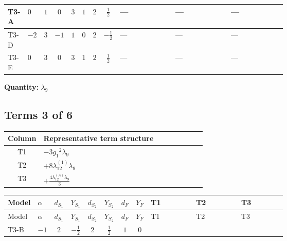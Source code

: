 \documentclass[8pt]{article}
\begin{document}
\begin{landscape}
\begin{longtable}{@{}llcccccc >{\raggedright\arraybackslash}p{0.21\linewidth} >{\raggedright\arraybackslash}p{0.21\linewidth} >{\raggedright\arraybackslash}p{0.21\linewidth}@{}}
\midrule
T3-A & $0$ & $1$ & $0$ & $3$ & $1$ & $2$ & $\frac{1}{2}$ & --- & --- & --- \\
\midrule
T3-D & $-2$ & $3$ & $-1$ & $1$ & $0$ & $2$ & $-\frac{1}{2}$ & --- & --- & --- \\
\midrule
T3-E & $0$ & $3$ & $0$ & $3$ & $1$ & $2$ & $\frac{1}{2}$ & --- & --- & --- \\
\midrule
\bottomrule
\end{longtable}
\clearpage
\noindent\textbf{Quantity: }$\lambda_{9}$\par\smallskip
\subsection*{Terms 3 of 6}
\begin{center}
\begin{tabular}{@{}c >{\raggedright\arraybackslash}p{0.82\linewidth}@{}}
\toprule
Column & Representative term structure \\
\midrule
T1 & \(\displaystyle -3 {g_1}^2 {\lambda_{9}}\) \\
\midrule
T2 & \(\displaystyle +8 {\lambda_{12}^{(1)}} {\lambda_{9}}\) \\
\midrule
T3 & \(\displaystyle +\frac{4 {\lambda_{12}^{(A)}} {\lambda_{9}}}{3}\) \\
\midrule
\bottomrule
\end{tabular}
\end{center}
\smallskip
\tiny
\begin{longtable}{@{}llcccccc >{\raggedright\arraybackslash}p{0.21\linewidth} >{\raggedright\arraybackslash}p{0.21\linewidth} >{\raggedright\arraybackslash}p{0.21\linewidth}@{}}
\toprule
Model & $\alpha$ & $d_{S_1}$ & $Y_{S_1}$ & $d_{S_2}$ & $Y_{S_2}$ & $d_F$ & $Y_F$ & T1 & T2 & T3 \\
\midrule
\endfirsthead
\toprule
Model & $\alpha$ & $d_{S_1}$ & $Y_{S_1}$ & $d_{S_2}$ & $Y_{S_2}$ & $d_F$ & $Y_F$ & T1 & T2 & T3 \\
\midrule
\endhead
T3-B & $-1$ & $2$ & $-\frac{1}{2}$ & $2$ & $\frac{1}{2}$ & $1$ & $0$ & \scriptsize\adjustbox{max width=\linewidth}{$\begin{gathered} -3 {g_1}^2 {\lambda_{9}}\end{gathered}$} & \scriptsize\adjustbox{max width=\linewidth}{$\begin{gathered} +8 {\lambda_{12}^{(1)}} {\lambda_{9}}\end{gathered}$} & \scriptsize\adjustbox{max width=\linewidth}{$\begin{gathered} +\frac{4 {\lambda_{12}^{(A)}} {\lambda_{9}}}{3}\end{gathered}$} \\

\end{longtable}
\end{landscape}
\end{document}
